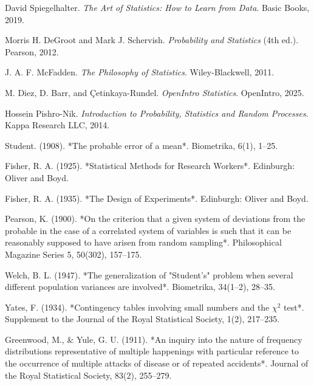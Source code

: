\documentclass{book}
\begin{document}
\begin{thebibliography}{999}

David Spiegelhalter. 
\textit{The Art of Statistics: How to Learn from Data}. 
Basic Books, 2019.

Morris H. DeGroot and Mark J. Schervish.
\textit{Probability and Statistics} (4th ed.).
Pearson, 2012.

J. A. F. McFadden.
\textit{The Philosophy of Statistics}.
Wiley-Blackwell, 2011.

M. Diez, D. Barr, and Çetinkaya-Rundel.
\textit{OpenIntro Statistics}.
OpenIntro, 2025.

Hossein Pishro-Nik.
\textit{Introduction to Probability, Statistics and Random Processes}.
Kappa Research LLC, 2014.

Student. (1908). *The probable error of a mean*. Biometrika, 6(1), 1–25.

Fisher, R. A. (1925). *Statistical Methods for Research Workers*. Edinburgh: Oliver and Boyd.

Fisher, R. A. (1935). *The Design of Experiments*. Edinburgh: Oliver and Boyd.

Pearson, K. (1900). *On the criterion that a given system of deviations from the probable in the case of a correlated system of variables is such that it can be reasonably supposed to have arisen from random sampling*. Philosophical Magazine Series 5, 50(302), 157–175.

Welch, B. L. (1947). *The generalization of "Student’s" problem when several different population variances are involved*. Biometrika, 34(1–2), 28–35.

Yates, F. (1934). *Contingency tables involving small numbers and the $\chi^2$ test*. Supplement to the Journal of the Royal Statistical Society, 1(2), 217–235.

Greenwood, M., \& Yule, G. U. (1911). *An inquiry into the nature of frequency distributions representative of multiple happenings with particular reference to the occurrence of multiple attacks of disease or of repeated accidents*. Journal of the Royal Statistical Society, 83(2), 255–279.

\end{thebibliography}
\end{document}
